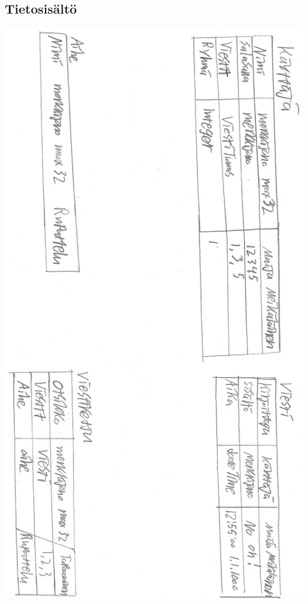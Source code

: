 \documentclass[a4paper, 12pt, finnish]{article}
\begin{document}
\subsection{Tietosisältö}
\includegraphics[width=\textwidth,height=\textheight,keepaspectratio]{tietosisalto.png}
\end{document}
